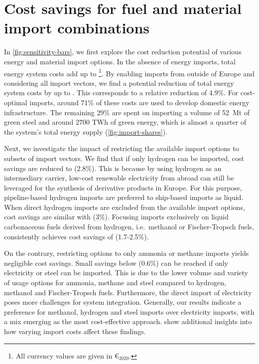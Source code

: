 \section*{Cost savings for fuel and material import combinations}

In \cref{fig:sensitivity-bars}, we first explore the cost reduction potential of
various energy and material import options. In the absence of energy imports,
total energy system costs add up to \footnote{All currency values
are given in \euro{}$_{2020}$.}. By enabling imports from outside of Europe and
considering all import vectors, we find a potential reduction of total energy
system costs by up to . This corresponds to a relative reduction of
4.9\%. For cost-optimal imports, around 71\% of these costs are used to develop
domestic energy infrastructure. The remaining 29\% are spent on importing a
volume of 52~Mt of green steel and around 2700 TWh of green energy, which is
almost a quarter of the system's total energy supply (\cref{fig:import-shares}).

Next, we investigate the impact of restricting the available import options to
subsets of import vectors. We find that if only hydrogen can be imported, cost
savings are reduced to  (2.8\%). This is because by using hydrogen as
an intermediary carrier, low-cost renewable electricity from abroad can still be
leveraged for the synthesis of derivative products in Europe. For this purpose,
pipeline-based hydrogen imports are preferred to ship-based imports as liquid.
When direct hydrogen imports are excluded from the available import options,
cost savings are similar with  (3\%). Focusing imports exclusively on
liquid carbonaceous fuels derived from hydrogen, i.e.~methanol or Fischer-Tropsch
fuels, consistently achieves cost savings of  (1.7-2.5\%).

On the contrary, restricting options to only ammonia or methane imports yields
negligible cost savings. Small savings below  (0.6\%) can be reached
if only electricity or steel can be imported. This is due to the lower volume
and variety of usage options for ammonia, methane and steel compared to
hydrogen, methanol and Fischer-Tropsch fuels. Furthermore, the direct import of
electricity poses more challenges for system integration. Generally, our results
indicate a preference for methanol, hydrogen and steel imports over electricity
imports, with a mix emerging as the most cost-effective approach.
 show additional insights into how varying import costs
affect these findings.

